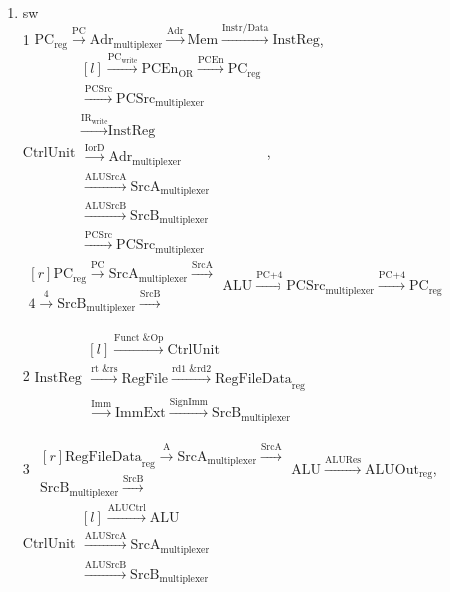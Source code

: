 \documentclass{article}
\begin{document}
\begin{enumerate}
\begin{enumerate}
\bigbreak

    \item sw\\
1 $\text{PC}_\text{reg} \xrightarrow{\text{PC}} \text{Adr}_\text{multiplexer} \xrightarrow{\text{Adr}} \text{Mem} \xrightarrow{\text{Instr/Data}} \text{InstReg}$, $\text{CtrlUnit} \begin{matrix*}[l] 
\xrightarrow{\text{PC}_\text{write}} \text{PCEn}_\text{OR} \xrightarrow{\text{PCEn}} \text{PC}_\text{reg} \\ 
\xrightarrow{\text{PCSrc}} \text{PCSrc}_\text{multiplexer} \\
\xrightarrow{\text{IR}_\text{write}} \text{InstReg} \\
\xrightarrow{\text{IorD}} \text{Adr}_\text{multiplexer} \\ \xrightarrow{\text{ALUSrcA}} \text{SrcA}_\text{multiplexer} \\ \xrightarrow{\text{ALUSrcB}} \text{SrcB}_\text{multiplexer} \\ \xrightarrow{\text{PCSrc}} \text{PCSrc}_\text{multiplexer} \end{matrix*}$,\\ $\begin{matrix*}[r] \text{PC}_\text{reg} \xrightarrow{\text{PC}} \text{SrcA}_\text{multiplexer} \xrightarrow{\text{SrcA}} \\ \text{4} \xrightarrow{\text{4}} \text{SrcB}_\text{multiplexer} \xrightarrow{\text{SrcB}}\end{matrix*} \text{ALU} \xrightarrow{\text{PC+4}} \text{PCSrc}_\text{multiplexer} \xrightarrow{\text{PC+4}} \text{PC}_\text{reg}$\\

\bigbreak

2 $\text{InstReg} \begin{matrix*}[l] 
\xrightarrow{\text{Funct \& Op}} \text{CtrlUnit} \\ \xrightarrow{\text{rt \& rs}} \text{RegFile} \xrightarrow{\text{rd1 \& rd2}} \text{RegFileData}_\text{reg} \\
\xrightarrow{\text{Imm}} \text{ImmExt} \xrightarrow{\text{SignImm}} \text{SrcB}_\text{multiplexer} \end{matrix*}$\\

\bigbreak

3 $\begin{matrix*}[r] \text{RegFileData}_\text{reg} \xrightarrow{\text{A}} \text{SrcA}_\text{multiplexer} \xrightarrow{\text{SrcA}} \\ \text{SrcB}_\text{multiplexer} \xrightarrow{\text{SrcB}}\end{matrix*} \text{ALU} \xrightarrow{\text{ALURes}} \text{ALUOut}_\text{reg}$, $\text{CtrlUnit} \begin{matrix*}[l] 
\xrightarrow{\text{ALUCtrl}} \text{ALU} \\ \xrightarrow{\text{ALUSrcA}} \text{SrcA}_\text{multiplexer} \\ \xrightarrow{\text{ALUSrcB}} \text{SrcB}_\text{multiplexer} \end{matrix*}$


\end{enumerate}
\end{enumerate}
\end{document}
